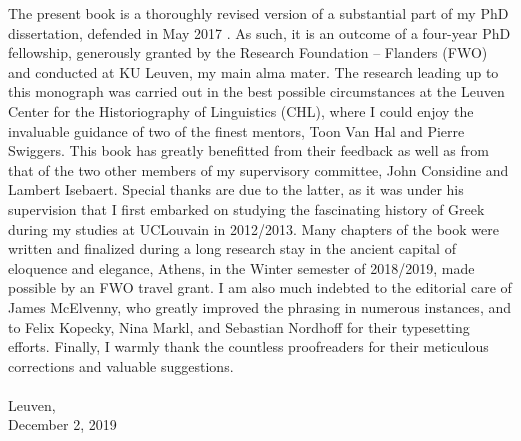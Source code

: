 \addchap{\lsAcknowledgementTitle} 
 
The present book is a thoroughly revised version of a substantial part of my PhD dissertation, defended in May 2017 \parencite{VanRooy2017}. As such, it is an outcome of a four-year PhD fellowship, generously granted by the Research Foundation – Flanders (FWO) and conducted at KU Leuven, my main alma mater. The research leading up to this monograph was carried out in the best possible circumstances at the Leuven Center for the Historiography of Linguistics (CHL), where I could enjoy the invaluable guidance of two of the finest mentors, Toon Van Hal and Pierre Swiggers. This book has greatly benefitted from their feedback as well as from that of the two other members of my supervisory committee, John Considine and Lambert Isebaert. Special thanks are due to the latter, as it was under his supervision that I first embarked on studying the fascinating history of Greek  during my studies at UCLouvain in 2012/2013. Many chapters of the book were written and finalized during a long research stay in the ancient capital of eloquence and elegance, Athens, in the Winter semester of 2018/2019, made possible by an FWO travel grant. I am also much indebted to the editorial care of James McElvenny, who greatly improved the  phrasing in numerous instances, and to Felix Kopecky, Nina Markl, and Sebastian Nordhoff for their typesetting efforts. Finally, I warmly thank the countless proofreaders for their meticulous corrections and valuable suggestions.\\\\
Leuven,\\December 2, 2019
